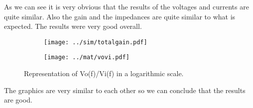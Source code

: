 As we can see it is very obvious that the results of the voltages and currents are quite similar. Also
the gain and the impedances are quite similar to what is expected. The results were very good overall.

\begin{figure}[h]
    \centering
    \begin{subfigure}{0.25\textwidth}
        \texttt{[image: ../sim/totalgain.pdf]}
    \end{subfigure}
    \begin{subfigure}{0.25\textwidth}
        \texttt{[image: ../mat/vovi.pdf]}
    \end{subfigure}
    \caption{\small Representation of Vo(f)/Vi(f) in a logarithmic scale. }
\end{figure}

The graphics are very similar to each other so we can conclude that the results are good.

